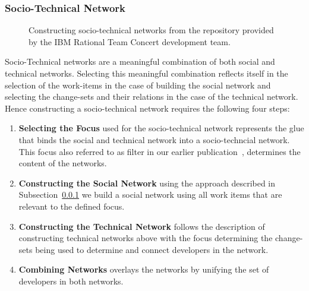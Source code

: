 \subsubsection{Socio-Technical Network}
\begin{figure*}[t!]
%	
  \centering
% 
\hspace{5pt}
\hspace{5pt} 
\hspace{5pt}
  \caption{Constructing socio-technical networks from the repository provided by the IBM Rational Team Concert development team.}
  \label{fig:construct-stc}
\end{figure*}

Socio-Technical networks are a meaningful combination of both social and technical networks.
Selecting this meaningful combination reflects itself in the selection of the work-items in the case of building the social network and selecting the change-sets and their relations in the case of the technical network.
Hence constructing a socio-technical network requires the following four steps:

\begin{enumerate}
\item\textbf{Selecting the Focus} used for the socio-technical network represents the glue that binds the social and technical network into a socio-techncial network. 
This focus also referred to as filter in our earlier publication~\cite{wolf:ieee:2009}, determines the content of the networks.
\item\textbf{Constructing the Social Network} using the approach described in Subsection~\ref{} we build a social network using all work items that are relevant to the defined focus.
\item\textbf{Constructing the Technical Network} follows the description of constructing technical networks above with the focus determining the change-sets being used to determine and connect developers in the network.
\item\textbf{Combining Networks} overlays the networks by unifying the set of developers in both networks.
\end{enumerate}

